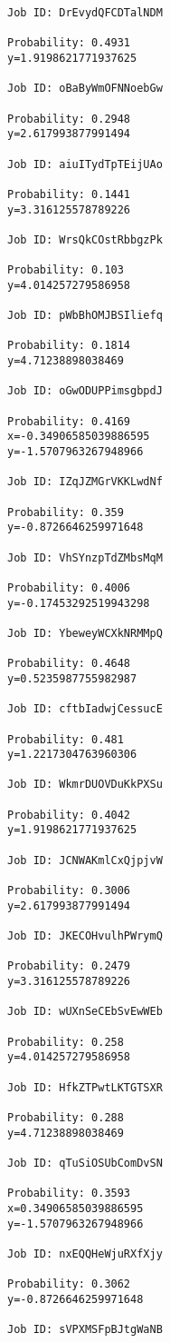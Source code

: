 \documentclass[11pt]{article}
\begin{document}
\begin{Verbatim}[commandchars=\\\{\}]
Job ID: DrEvydQFCDTalNDM

Probability: 0.4931
y=1.9198621771937625

Job ID: oBaByWmOFNNoebGw

Probability: 0.2948
y=2.617993877991494

Job ID: aiuITydTpTEijUAo

Probability: 0.1441
y=3.316125578789226

Job ID: WrsQkCOstRbbgzPk

Probability: 0.103
y=4.014257279586958

Job ID: pWbBhOMJBSIliefq

Probability: 0.1814
y=4.71238898038469

Job ID: oGwODUPPimsgbpdJ

Probability: 0.4169
x=-0.34906585039886595
y=-1.5707963267948966

Job ID: IZqJZMGrVKKLwdNf

Probability: 0.359
y=-0.8726646259971648

Job ID: VhSYnzpTdZMbsMqM

Probability: 0.4006
y=-0.17453292519943298

Job ID: YbeweyWCXkNRMMpQ

Probability: 0.4648
y=0.5235987755982987

Job ID: cftbIadwjCessucE

Probability: 0.481
y=1.2217304763960306

Job ID: WkmrDUOVDuKkPXSu

Probability: 0.4042
y=1.9198621771937625

Job ID: JCNWAKmlCxQjpjvW

Probability: 0.3006
y=2.617993877991494

Job ID: JKECOHvulhPWrymQ

Probability: 0.2479
y=3.316125578789226

Job ID: wUXnSeCEbSvEwWEb

Probability: 0.258
y=4.014257279586958

Job ID: HfkZTPwtLKTGTSXR

Probability: 0.288
y=4.71238898038469

Job ID: qTuSiOSUbComDvSN

Probability: 0.3593
x=0.34906585039886595
y=-1.5707963267948966

Job ID: nxEQQHeWjuRXfXjy

Probability: 0.3062
y=-0.8726646259971648

Job ID: sVPXMSFpBJtgWaNB


\end{Verbatim}
\end{document}
